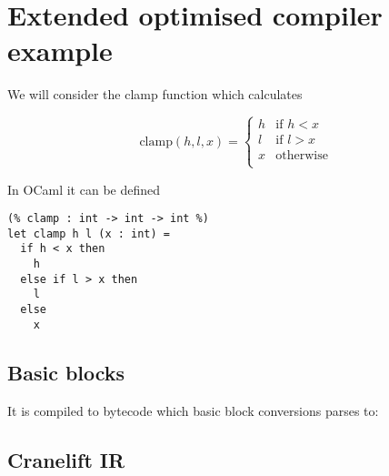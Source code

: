 
\cleardoublepage

\nocite{*}
\printbibliography[heading=bibintoc]

\appendix

\cleardoublepage

\chapter{Extended optimised compiler example} \label{appendix-example}

We will consider the clamp function which calculates

\[
    \text{clamp}(h, l, x) = \begin{cases*}
        h & \text{if }h < x  \\
        l & \text{if }l > x  \\
        x & \text{otherwise} \\
    \end{cases*}
\]

In OCaml it can be defined

\begin{verbatim}
(% clamp : int -> int -> int %)
let clamp h l (x : int) =
  if h < x then
    h
  else if l > x then
    l
  else
    x
\end{verbatim}

\section{Basic blocks}

It is compiled to bytecode which basic block conversions parses to:

% 
% 
% 
% 
% 



\section{Cranelift IR}

